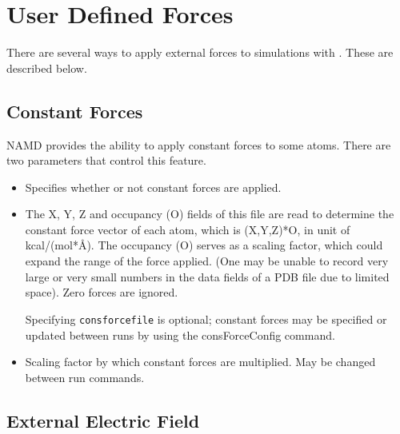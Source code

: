 
\section{User Defined Forces}
\label{section:userdef}



There are several ways to apply external forces to simulations with \NAMD.
These are described below.


\subsection{Constant Forces}

NAMD provides the ability to apply constant forces to some atoms.
There are two parameters that control this feature.

\begin{itemize}

\item
{}
{Specifies whether or not constant forces are applied.}

\item
{}
{
The X, Y, Z and occupancy (O) fields of this file are read to
determine the constant force vector of each atom, which is
(X,Y,Z)*O, in unit of kcal/(mol*\AA). The occupancy (O) serves as
a scaling factor, which could expand the range of the force
applied. (One may be unable to record very large or very small
numbers in the data fields of a PDB file due to limited space).
Zero forces are ignored.

Specifying {\tt consforcefile} is optional; constant forces may be specified
or updated between runs by using the consForceConfig command.
}

\item
{}
{Scaling factor by which constant forces are multiplied.  May be changed between run commands.}

\end{itemize}


\subsection{External Electric Field}

